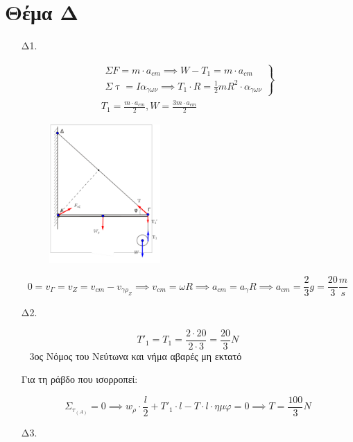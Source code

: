 \documentclass[12pt]{article}
\begin{document}
  \section*{Θέμα Δ}

  \begin{enumerate}
    \item [Δ1.]

    \begin{gather*}
      \left. \begin{matrix}ΣF=m\cdot a_{cm}\implies W-T_1=m\cdot a_{cm} \\ Σ\uptau=Iα_{γων}\implies T_1\cdot R=\frac{1}{2}mR^2\cdot α_{γων}\end{matrix} \right\} \\
      T_1=\frac{m\cdot a_{cm}}{2},W=\frac{3m\cdot a_{cm}}{2}
    \end{gather*}

    \begin{figure}[h]
      \includegraphics[width=0.4\textwidth]{ΦυσικήΔ1.png}
      \centering
    \end{figure}

    $$0=v_Γ=v_Z=v_{cm}-v_{γρ_Ζ}\implies v_{cm}=ωR\implies a_{cm}=a_γ R\implies a_{cm}=\frac{2}{3}g=\frac{20}{3}\frac{m}{s}$$

    \item [Δ2.]

    $$T'_1=T_1=\frac{2\cdot 20}{2\cdot 3}=\frac{20}{3}N$$
  
    3ος Νόμος του Νεύτωνα και νήμα αβαρές μη εκτατό

    Για τη ράβδο που ισορροπεί:

    $$Σ_{τ_{(Α)}}=0\implies w_ρ\cdot\frac{l}{2}+T'_1\cdot l-T\cdot l\cdot ημφ=0\implies T=\frac{100}{3}N$$

    \item [Δ3.]



\end{enumerate}
\end{document}
